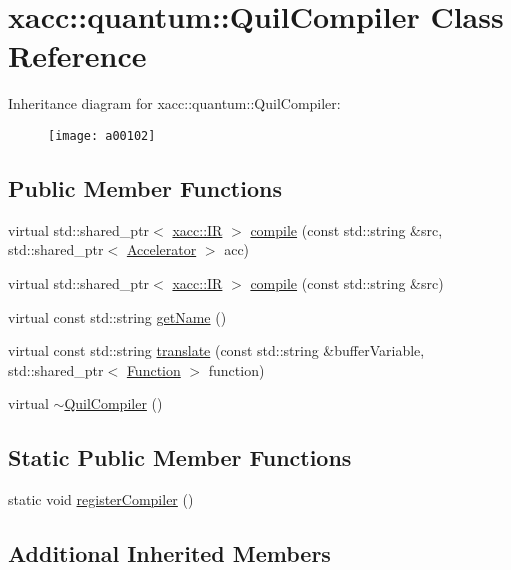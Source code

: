 \hypertarget{a00102}{}\section{xacc\+:\+:quantum\+:\+:Quil\+Compiler Class Reference}
\label{a00102}
Inheritance diagram for xacc\+:\+:quantum\+:\+:Quil\+Compiler\+:\begin{figure}[H]
\begin{center}
\leavevmode
\texttt{[image: a00102]}
\end{center}
\end{figure}
\subsection*{Public Member Functions}
\begin{DoxyCompactItemize}
\item 
virtual std\+::shared\+\_\+ptr$<$ \hyperlink{a00077}{xacc\+::\+IR} $>$ \hyperlink{a00102_a2421482415ca4e09963ea4ecddff8100}{compile} (const std\+::string \&src, std\+::shared\+\_\+ptr$<$ \hyperlink{a00017}{Accelerator} $>$ acc)
\item 
virtual std\+::shared\+\_\+ptr$<$ \hyperlink{a00077}{xacc\+::\+IR} $>$ \hyperlink{a00102_adf4d321ecb0df3fa7728999f941c83b2}{compile} (const std\+::string \&src)
\item 
virtual const std\+::string \hyperlink{a00102_ae7d52140b6dd52730edc6e38ae48f437}{get\+Name} ()
\item 
virtual const std\+::string \hyperlink{a00102_a66ca00bbb1f30e7bc6dd86b1e267b93b}{translate} (const std\+::string \&buffer\+Variable, std\+::shared\+\_\+ptr$<$ \hyperlink{a00059}{Function} $>$ function)
\item 
virtual \hyperlink{a00102_a0866a9f695f28c90ac1f4754374f3bfe}{$\sim$\+Quil\+Compiler} ()
\end{DoxyCompactItemize}
\subsection*{Static Public Member Functions}
\begin{DoxyCompactItemize}
\item 
static void \hyperlink{a00102_aaec99a14bede717bf02a0f65af2a3c69}{register\+Compiler} ()
\end{DoxyCompactItemize}
\subsection*{Additional Inherited Members}


